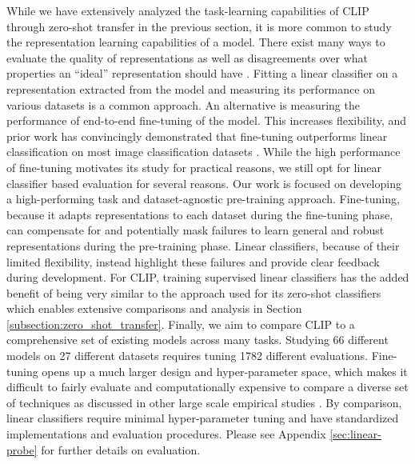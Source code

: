 \documentclass{article}
\begin{document}
While we have extensively analyzed the task-learning capabilities of CLIP through zero-shot transfer in the previous section, it is more common to study the representation learning capabilities of a model. There exist many ways to evaluate the quality of representations as well as disagreements over what properties an ``ideal'' representation should have \citep{locatello2020sober}. Fitting a linear classifier on a representation extracted from the model and measuring its performance on various datasets is a common approach. An alternative is measuring the performance of end-to-end fine-tuning of the model. This increases flexibility, and prior work has convincingly demonstrated that fine-tuning outperforms linear classification on most image classification datasets \citep{kornblith2019better,zhai2019large}. While the high performance of fine-tuning motivates its study for practical reasons, we still opt for linear classifier based evaluation for several reasons. Our work is focused on developing a high-performing task and dataset-agnostic pre-training approach. Fine-tuning, because it adapts representations to each dataset during the fine-tuning phase, can compensate for and potentially mask failures to learn general and robust representations during the pre-training phase. Linear classifiers, because of their limited flexibility, instead highlight these failures and provide clear feedback during development. For CLIP, training supervised linear classifiers has the added benefit of being very similar to the approach used for its zero-shot classifiers which enables extensive comparisons and analysis in Section \ref{subsection:zero_shot_transfer}. Finally, we aim to compare CLIP to a comprehensive set of existing models across many tasks. Studying 66 different models on 27 different datasets requires tuning 1782 different evaluations. Fine-tuning opens up a much larger design and hyper-parameter space, which makes it difficult to fairly evaluate and computationally expensive to compare a diverse set of techniques as discussed in other large scale empirical studies \citep{lucic2018gans,choi2019empirical}. By comparison, linear classifiers require minimal hyper-parameter tuning and have standardized implementations and evaluation procedures. Please see Appendix \ref{sec:linear-probe} for further details on evaluation.
\end{document}
